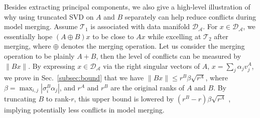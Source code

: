 
Besides extracting principal components, we also give a high-level illustration of why using truncated SVD on $A$ and $B$ separately can help reduce conflicts during model merging. Assume $\mathcal{T}_1$ is associated with data manifold $\mathcal{D_A}$. For $x\in\mathcal{D_A}$, we essentially hope $(A\oplus B)x$ to be close to $Ax$ while excelling at $\mathcal{T}_2$ after merging, where $\oplus$ denotes the merging operation. Let us consider the merging operation to be plainly $A+B$, then the level of conflicts can be measured by $\|Bx\|$. By expressing $x\in\mathcal{D_A}$ via the right singular vectors of $A$, $x=\sum_j \alpha_j v_j^A$, we prove in Sec.~\ref{subsec:bound} that we have $\|Bx\|\leq r^B\beta \sqrt{r^A}$,
where $\beta=\max_{i,j}|\sigma_i^B\alpha_j|$, and $r^A$ and $r^B$ are the original ranks of $A$ and $B$.
By truncating $B$ to rank-$r$, this upper bound is lowered by $(r^B-r)\beta \sqrt{r^A}$
, implying potentially less conflicts in model merging. 




